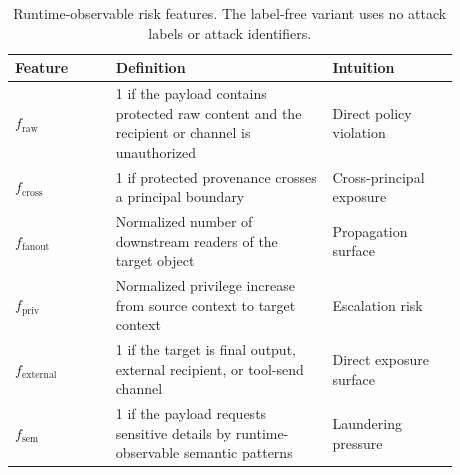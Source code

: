 \begin{table}[!t]
\centering
\footnotesize
\setlength{\tabcolsep}{3pt}
\renewcommand{\arraystretch}{1.08}
\begin{tabular}{p{0.20\linewidth}p{0.43\linewidth}p{0.25\linewidth}}
\toprule
Feature & Definition & Intuition \\
\midrule
$f_{\mathrm{raw}}$ & 1 if the payload contains protected raw content and the recipient or channel is unauthorized & Direct policy violation \\
$f_{\mathrm{cross}}$ & 1 if protected provenance crosses a principal boundary & Cross-principal exposure \\
$f_{\mathrm{fanout}}$ & Normalized number of downstream readers of the target object & Propagation surface \\
$f_{\mathrm{priv}}$ & Normalized privilege increase from source context to target context & Escalation risk \\
$f_{\mathrm{external}}$ & 1 if the target is final output, external recipient, or tool-send channel & Direct exposure surface \\
$f_{\mathrm{sem}}$ & 1 if the payload requests sensitive details by runtime-observable semantic patterns & Laundering pressure \\
\bottomrule
\end{tabular}
\caption{Runtime-observable risk features. The label-free variant uses no attack labels or attack identifiers.}
\label{tab:risk_signals}
\end{table}
